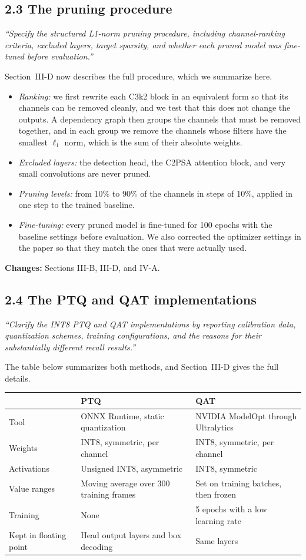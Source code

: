 \documentclass[10pt]{article}
\newcommand{\comment}[2]{\subsection*{#1}\textit{#2}\par}
\newcommand{\changes}[1]{\par\textbf{Changes:} #1}
\begin{document}
\comment{2.3 The pruning procedure}{``Specify the structured L1-norm pruning procedure, including channel-ranking criteria, excluded layers, target sparsity, and whether each pruned model was fine-tuned before evaluation.''}
Section~III-D now describes the full procedure, which we summarize here.
\begin{itemize}
\item \emph{Ranking:} we first rewrite each C3k2 block in an equivalent form so that its channels can be removed cleanly, and we test that this does not change the outputs. A dependency graph then groups the channels that must be removed together, and in each group we remove the channels whose filters have the smallest $\ell_1$ norm, which is the sum of their absolute weights.
\item \emph{Excluded layers:} the detection head, the C2PSA attention block, and very small convolutions are never pruned.
\item \emph{Pruning levels:} from 10\% to 90\% of the channels in steps of 10\%, applied in one step to the trained baseline.
\item \emph{Fine-tuning:} every pruned model is fine-tuned for 100 epochs with the baseline settings before evaluation. We also corrected the optimizer settings in the paper so that they match the ones that were actually used.
\end{itemize}
\changes{Sections III-B, III-D, and IV-A.}

\comment{2.4 The PTQ and QAT implementations}{``Clarify the INT8 PTQ and QAT implementations by reporting calibration data, quantization schemes, training configurations, and the reasons for their substantially different recall results.''}
\begin{minipage}{\linewidth}
The table below summarizes both methods, and Section~III-D gives the full details.\par\smallskip
\begin{tabular}{@{}lll@{}}
\toprule
 & PTQ & QAT \\
\midrule
Tool & ONNX Runtime, static quantization & NVIDIA ModelOpt through Ultralytics \\
Weights & INT8, symmetric, per channel & INT8, symmetric, per channel \\
Activations & Unsigned INT8, asymmetric & INT8, symmetric \\
Value ranges & Moving average over 300 training frames & Set on training batches, then frozen \\
Training & None & 5 epochs with a low learning rate \\
Kept in floating point & Head output layers and box decoding & Same layers \\
\bottomrule
\end{tabular}
\end{minipage}
\end{document}

